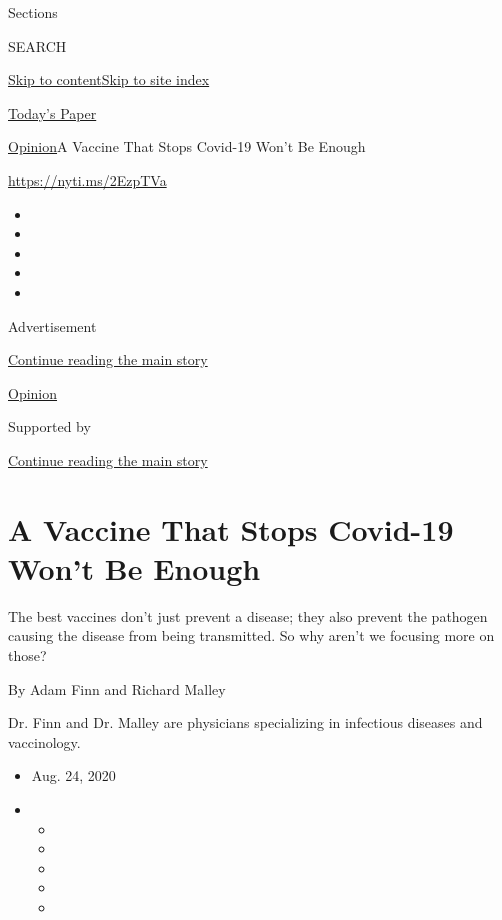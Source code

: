 Sections

SEARCH

\protect\hyperlink{site-content}{Skip to
content}\protect\hyperlink{site-index}{Skip to site index}

\href{https://myaccount.nytimes3xbfgragh.onion/auth/login?response_type=cookie\&client_id=vi}{}

\href{https://www.nytimes3xbfgragh.onion/section/todayspaper}{Today's
Paper}

\href{/section/opinion}{Opinion}\textbar{}A Vaccine That Stops Covid-19
Won't Be Enough

\url{https://nyti.ms/2EzpTVa}

\begin{itemize}
\item
\item
\item
\item
\item
\end{itemize}

Advertisement

\protect\hyperlink{after-top}{Continue reading the main story}

\href{/section/opinion}{Opinion}

Supported by

\protect\hyperlink{after-sponsor}{Continue reading the main story}

\hypertarget{a-vaccine-that-stops-covid-19-wont-be-enough}{%
\section{A Vaccine That Stops Covid-19 Won't Be
Enough}\label{a-vaccine-that-stops-covid-19-wont-be-enough}}

The best vaccines don't just prevent a disease; they also prevent the
pathogen causing the disease from being transmitted. So why aren't we
focusing more on those?

By Adam Finn and Richard Malley

Dr. Finn and Dr. Malley are physicians specializing in infectious
diseases and vaccinology.

\begin{itemize}
\item
  Aug. 24, 2020
\item
  \begin{itemize}
  \item
  \item
  \item
  \item
  \item
  \end{itemize}
\end{itemize}

